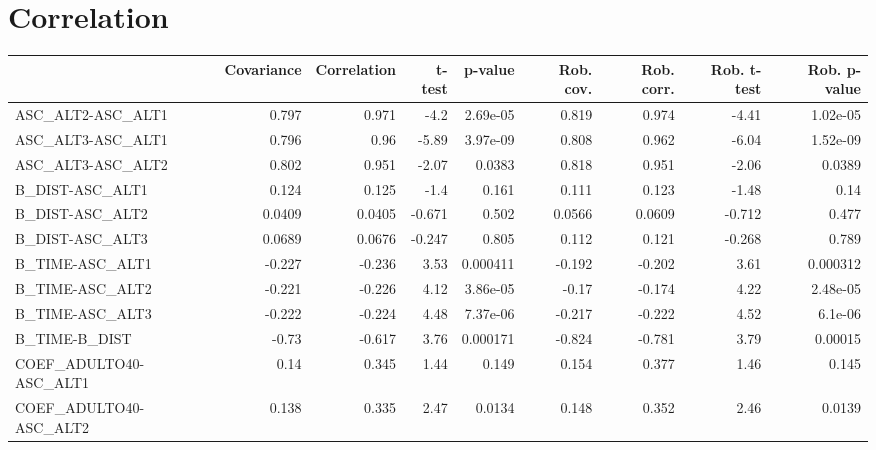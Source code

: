 \section{Correlation}
\begin{tabular}{lrrrrrrrr}
\toprule
{} &  Covariance &  Correlation &  t-test &  p-value &  Rob. cov. &  Rob. corr. &  Rob. t-test &  Rob. p-value \\
\midrule
ASC\_ALT2-ASC\_ALT1                 &       0.797 &        0.971 &    -4.2 & 2.69e-05 &      0.819 &       0.974 &        -4.41 &      1.02e-05 \\
ASC\_ALT3-ASC\_ALT1                 &       0.796 &         0.96 &   -5.89 & 3.97e-09 &      0.808 &       0.962 &        -6.04 &      1.52e-09 \\
ASC\_ALT3-ASC\_ALT2                 &       0.802 &        0.951 &   -2.07 &   0.0383 &      0.818 &       0.951 &        -2.06 &        0.0389 \\
B\_DIST-ASC\_ALT1                   &       0.124 &        0.125 &    -1.4 &    0.161 &      0.111 &       0.123 &        -1.48 &          0.14 \\
B\_DIST-ASC\_ALT2                   &      0.0409 &       0.0405 &  -0.671 &    0.502 &     0.0566 &      0.0609 &       -0.712 &         0.477 \\
B\_DIST-ASC\_ALT3                   &      0.0689 &       0.0676 &  -0.247 &    0.805 &      0.112 &       0.121 &       -0.268 &         0.789 \\
B\_TIME-ASC\_ALT1                   &      -0.227 &       -0.236 &    3.53 & 0.000411 &     -0.192 &      -0.202 &         3.61 &      0.000312 \\
B\_TIME-ASC\_ALT2                   &      -0.221 &       -0.226 &    4.12 & 3.86e-05 &      -0.17 &      -0.174 &         4.22 &      2.48e-05 \\
B\_TIME-ASC\_ALT3                   &      -0.222 &       -0.224 &    4.48 & 7.37e-06 &     -0.217 &      -0.222 &         4.52 &       6.1e-06 \\
B\_TIME-B\_DIST                     &       -0.73 &       -0.617 &    3.76 & 0.000171 &     -0.824 &      -0.781 &         3.79 &       0.00015 \\
COEF\_ADULTO40-ASC\_ALT1            &        0.14 &        0.345 &    1.44 &    0.149 &      0.154 &       0.377 &         1.46 &         0.145 \\
COEF\_ADULTO40-ASC\_ALT2            &       0.138 &        0.335 &    2.47 &   0.0134 &      0.148 &       0.352 &         2.46 &        0.0139 \\

\end{tabular}
